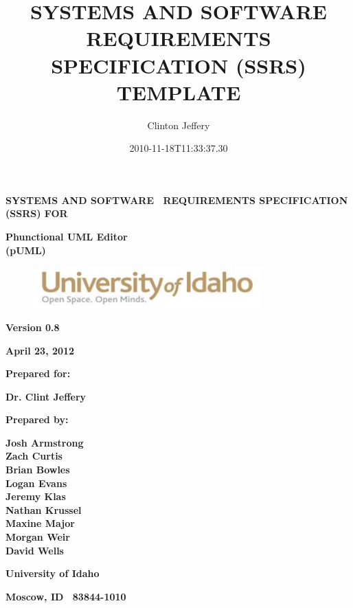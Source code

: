 \documentclass[twoside,letterpaper]{article}
\title{SYSTEMS AND SOFTWARE REQUIREMENTS SPECIFICATION (SSRS) TEMPLATE}
\author{Clinton Jeffery}
\date{2010-11-18T11:33:37.30}
\begin{document}
\clearpage
{\centering\bfseries
SYSTEMS AND SOFTWARE \ REQUIREMENTS SPECIFICATION (SSRS) FOR
\par}


\bigskip

{\centering\bfseries
Phunctional UML Editor
\\(pUML)
\par}


\bigskip


\bigskip


\bigskip

\begin{figure}
\centering
\includegraphics[width=3.5in]{uidahologo.jpg}
\end{figure}

\bigskip


\bigskip

{\centering\bfseries
Version 0.8
\par}

{\centering\bfseries
April 23, 2012
\par}


\bigskip


\bigskip

{\centering\bfseries
Prepared for:
\par}
{\centering\bfseries
Dr. Clint Jeffery
\par}

\bigskip


\bigskip

{\centering\bfseries
Prepared by:
\par}

{\centering\bfseries
Josh Armstrong
\\Zach Curtis
\\Brian Bowles
\\Logan Evans
\\Jeremy Klas
\\Nathan Krussel
\\Maxine Major
\\Morgan Weir
\\David Wells
\par}

{\centering\bfseries
University of Idaho
\par}

{\centering\bfseries
Moscow, ID \ 83844-1010
\par}
\end{document}
